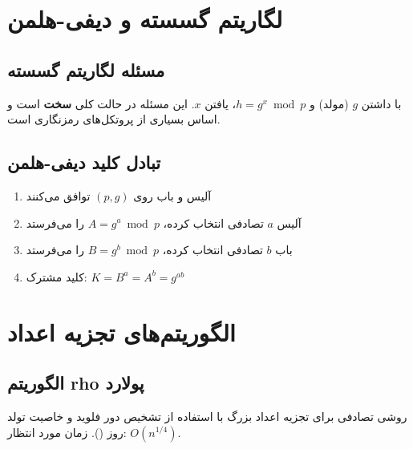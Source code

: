 \documentclass{matinbook}
\begin{document}
    \section{لگاریتم گسسته و دیفی-هلمن}
    
    \subsection{مسئله لگاریتم گسسته}
    
    \begin{definition}
        با داشتن $g$ (مولد) و $h = g^{x} \bmod p$،
        یافتن $x$. این مسئله در حالت کلی
        \textbf{سخت} است و اساس بسیاری از
        پروتکل‌های رمزنگاری است.
        \label{def:discrete-log}
    \end{definition}
    
    \subsection{تبادل کلید دیفی-هلمن}
    
    \begin{enumerate}
        \item آلیس و باب روی $(p, g)$ توافق می‌کنند
        \item آلیس $a$ تصادفی انتخاب کرده،
        $A = g^{a} \bmod p$ را می‌فرستد
        \item باب $b$ تصادفی انتخاب کرده،
        $B = g^{b} \bmod p$ را می‌فرستد
        \item کلید مشترک: $K = B^{a} = A^{b} = g^{ab}$
    \end{enumerate}
    
    \section{الگوریتم‌های تجزیه اعداد}
    
    \subsection{الگوریتم rho پولارد}
    
    \begin{definition}
        روشی تصادفی برای تجزیه اعداد بزرگ
        با استفاده از تشخیص دور فلوید
        و خاصیت تولد روز ().
        زمان مورد انتظار: $O(n^{1/4})$.
        \label{def:pollard-rho}
    \end{definition}
    
\end{document}
